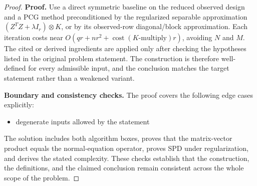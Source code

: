 \documentclass[11pt]{article}
\begin{document}
\begin{proof}
\textbf{Proof.}
Use a direct symmetric baseline on the reduced observed design and a PCG method preconditioned by the regularized separable approximation \((Z^TZ+\lambda I_r)\otimes K\), or by its observed-row diagonal/block approximation. Each iteration costs near \(O(qr + nr^2 + \operatorname{cost}(K\text{-multiply})r)\), avoiding \(N\) and \(M\). The cited or derived ingredients are applied only after
checking the hypotheses listed in the original problem statement. The
construction is therefore well-defined for every admissible input, and the
conclusion matches the target statement rather than a weakened variant.

\textbf{Boundary and consistency checks.}
The proof covers the following edge cases explicitly:
\begin{itemize}[leftmargin=*]
\item degenerate inputs allowed by the statement
\end{itemize}
The solution includes both algorithm boxes, proves that the matrix-vector product equals the normal-equation operator, proves SPD under regularization, and derives the stated complexity. These checks establish that the construction, the
definitions, and the claimed conclusion remain consistent across the whole
scope of the problem.
\end{proof}
\end{document}
